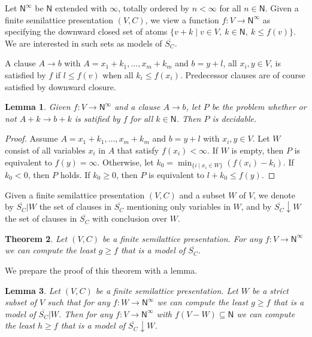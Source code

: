 \documentclass[11pt,a4paper]{article}
\newtheorem{theorem}{Theorem}[section]
\newtheorem{lemma}[theorem]{Lemma}
\newcommand{\N}{\mathsf{N}}
\newcommand\set[1]{\{#1\}}
\newcommand\jbody[3]{{{#1_1}+{#2_1}},\ldots,{{#1_#3}+{#2_#3}}}
\newcommand\Ninf{\N^\infty}
\newcommand\upS[1]{\overline{S_{#1}}}
\newcommand{\FYI}[1]{{\color{red}#1}}
\begin{document}
Let $\Ninf$ be $\N$ extended with $\infty$, totally ordered
by $n < \infty$ for all $n\in\N$. 
Given a finite semilattice presentation $(V,C)$, we view
a function $f: V\to\Ninf$ as specifying the downward closed set
of atoms $\set{v+k \mid v\in V,~k\in\N,~k \leq f(v)}$.
We are interested in such sets as models of $\upS{C}$.
\FYI{A clause $A\to b$ with 
$A = \jbody{x}{k}{m}$ and $b= y+l$, all $x_i,y \in V$,
is satisfied by $f$ if $l\leq f(v)$ when all $k_i \leq f(x_i)$.
Predecessor clauses are of course satisfied by downward closure.

\begin{lemma}\label{lem:f-sat}
Given $f: V\to\Ninf$ and a clause $A\to b$, let $P$ be the problem whether or not
$A+k\to b+k$ is satified by $f$ for all $k\in\N$. Then $P$ is decidable.
\end{lemma}
\begin{proof}
Assume $A = \jbody{x}{k}{m}$ and $b= y+l$ with $x_i,y \in V$.
Let $W$ consist of all variables $x_i$ in $A$ that satisfy $f(x_i)<\infty$.
If $W$ is empty, then $P$ is equivalent to $f(y)=\infty$.
Otherwise, let $k_0 = \min_{\set{i \mid x_i \in W}} (f(x_i)-k_i)$.
If $k_0 < 0$, then $P$ holds. If $k_0 \geq 0$, 
then $P$ is equivalent to $l+k_0 \leq f(y)$.
\end{proof}}

Given a finite semilattice presentation $(V,C)$
and a subset $W$ of $V$, we denote by $\upS{C}|W$ 
the set of clauses in $\upS{C}$ mentioning only variables in $W$,
and by $\upS{C}{\downarrow}W$
the set of clauses in $\upS{C}$ with conclusion over $W$.

\begin{theorem}\label{thm:main}
Let  $(V,C)$ be a finite semilattice presentation.
For any $f: V\to\Ninf$ we can compute
the least $g \geq f$ that is a model of $\upS{C}$.
\end{theorem}

We prepare the proof of this theorem with a lemma.

\begin{lemma}\label{lem:secondary}
Let  $(V,C)$ be a finite semilattice presentation.
Let $W$ be a strict subset of $V$ such that 
for any $f: W\to\Ninf$ we can compute
the least $g \geq f$ that is a model of $\upS{C}|W$.
Then for any $f: V\to\Ninf$ with $f(V-W)\subseteq \N$ we can compute
the least $h \geq f$ that is a model of $\upS{C}{\downarrow}W$.
\end{lemma}
\end{document}
